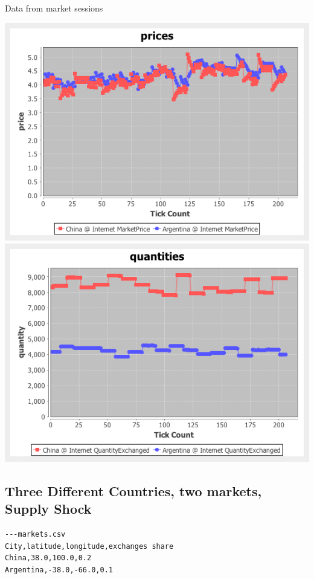 \documentclass{article}
\begin{document}
\noindent Data from market sessions

\vskip2mm
\hskip-2cm
\includegraphics[scale=0.4]{fig_case6_prices}
\includegraphics[scale=0.4]{fig_case6_quantities}



\subsection{Three Different Countries, two markets, Supply Shock}
\begin{verbatim}
---markets.csv
City,latitude,longitude,exchanges share
China,38.0,100.0,0.2
Argentina,-38.0,-66.0,0.1

\end{verbatim}
\end{document}
